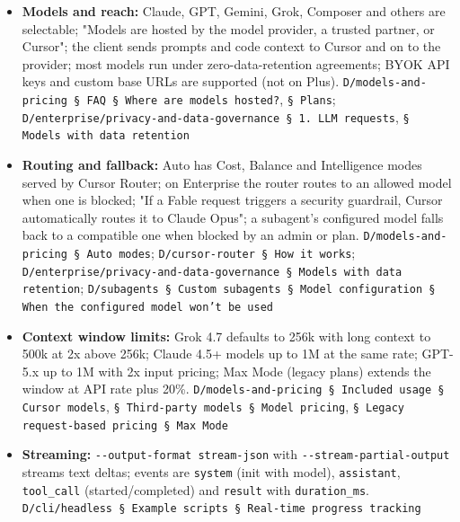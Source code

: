 \begin{itemize}
\item \textbf{Models and reach:} Claude, GPT, Gemini, Grok, Composer and others are selectable; "Models are hosted by the model provider, a trusted partner, or Cursor"; the client sends prompts and code context to Cursor and on to the provider; most models run under zero-data-retention agreements; BYOK API keys and custom base URLs are supported (not on Plus). \texttt{D/\allowbreak{}models-\allowbreak{}and-\allowbreak{}pricing § FAQ § Where are models hosted?}, \texttt{§ Plans}; \texttt{D/\allowbreak{}enterprise/\allowbreak{}privacy-\allowbreak{}and-\allowbreak{}data-\allowbreak{}governance § 1.\allowbreak{} LLM requests}, \texttt{§ Models with data retention}
\item \textbf{Routing and fallback:} Auto has Cost, Balance and Intelligence modes served by Cursor Router; on Enterprise the router routes to an allowed model when one is blocked; "If a Fable request triggers a security guardrail, Cursor automatically routes it to Claude Opus"; a subagent's configured model falls back to a compatible one when blocked by an admin or plan. \texttt{D/\allowbreak{}models-\allowbreak{}and-\allowbreak{}pricing § Auto modes}; \texttt{D/\allowbreak{}cursor-\allowbreak{}router § How it works}; \texttt{D/\allowbreak{}enterprise/\allowbreak{}privacy-\allowbreak{}and-\allowbreak{}data-\allowbreak{}governance § Models with data retention}; \texttt{D/\allowbreak{}subagents § Custom subagents § Model configuration § When the configured model won't be used}
\item \textbf{Context window limits:} Grok 4.7 defaults to 256k with long context to 500k at 2x above 256k; Claude 4.5+ models up to 1M at the same rate; GPT-5.x up to 1M with 2x input pricing; Max Mode (legacy plans) extends the window at API rate plus 20\%. \texttt{D/\allowbreak{}models-\allowbreak{}and-\allowbreak{}pricing § Included usage § Cursor models}, \texttt{§ Third-\allowbreak{}party models § Model pricing}, \texttt{§ Legacy request-\allowbreak{}based pricing § Max Mode}
\item \textbf{Streaming:} \texttt{-\allowbreak{}-\allowbreak{}output-\allowbreak{}format stream-\allowbreak{}json} with \texttt{-\allowbreak{}-\allowbreak{}stream-\allowbreak{}partial-\allowbreak{}output} streams text deltas; events are \texttt{system} (init with model), \texttt{assistant}, \texttt{tool\_\allowbreak{}call} (started/completed) and \texttt{result} with \texttt{duration\_\allowbreak{}ms}. \texttt{D/\allowbreak{}cli/\allowbreak{}headless § Example scripts § Real-\allowbreak{}time progress tracking}
\end{itemize}


